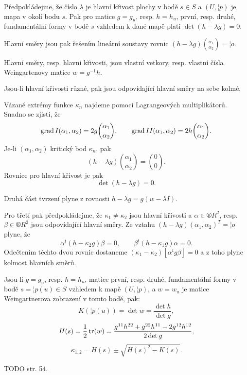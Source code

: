 \documentclass[12pt]{article}                   %
\begin{document}
        \begin{veta}
            Předpokládejme, že číslo $\lambda$ je hlavní křivost plochy v bodě $s \in S$ a $(U, ¦p)$ je mapa v okolí bodu $s$. Pak pro matice $g = g_u$, resp. $h = h_u$, první, resp. druhé, fundamentální formy v bodě $s$ vzhledem k dané mapě platí $\det(h - \lambda g) = 0$.

            Hlavní směry jsou pak řešením lineární soustavy rovnic $(h - \lambda g) \binom{\alpha_1}{\alpha_2} = ¦o$.

            Hlavní směry, resp. hlavní křivosti, jsou vlastní vetkory, resp. vlastní čísla Weingartenovy matice $w = g^{-1}h$.

            Jsou-li hlavní křivosti různé, pak jsou odpovídající hlavní směry na sebe kolmé.

            \begin{dukazin}
                Vázané extrémy funkce $\kappa_n$ najdeme pomocí Lagrangeových multiplikátorů. Snadno se zjistí, že
                $$ \operatorname{grad} I(\alpha_1, \alpha_2) = 2g\binom{\alpha_1}{\alpha_2}, \qquad \operatorname{grad} II(\alpha_1, \alpha_2) = 2h\binom{\alpha_1}{\alpha_2}. $$
                Je-li $(\alpha_1, \alpha_2)$ kritický bod $\kappa_n$, pak
                $$ (h - \lambda g)\binom{\alpha_1}{\alpha_2} = \binom{0}{0}. $$
                Rovnice pro hlavní křivost je pak
                $$ \det(h - \lambda g) = 0. $$

                Druhá část tvrzení plyne z rovnosti $h - \lambda g = g(w - \lambda I)$.

                Pro třetí pak předpokládejme, že $\kappa_1 ≠ \kappa_2$ jsou hlavní křivosti a $\alpha \in ®R^2$, resp. $\beta \in ®R^2$ jsou odpovídající hlavní směry. Ze vztahu $(h - \lambda g)(\alpha_1, \alpha_2)^T = ¦o$ plyne, že
                $$ \alpha^t(h - \kappa_2g)\beta = 0, \qquad \beta^t(h - \kappa_1 g)\alpha = 0. $$
                Odečtením těchto dvou rovnic dostaneme $(\kappa_1 - \kappa_2)[\alpha^tg\beta] = 0$ a z toho plyne kolmost hlavních směrů.
            \end{dukazin}
        \end{veta}

        \begin{veta}
            Jsou-li $g = g_u$, resp. $h = h_u$, matice první, resp. druhé, fundamentální formy v bodě $s = ¦p(u) \in S$ vzhledem k mapě $(U, ¦p)$, a $w = w_u$ je matice Weingartnerova zobrazení v tomto bodě, pak:
            $$ K(¦p(u)) = \det w = \frac{\det h}{\det g}, $$
            $$ H(s) = \frac{1}{2}\operatorname{tr}(w) = \frac{g^{11}h^{22} + g^{22}h^{11} - 2g^{12}h^{12}}{2\det g}, $$
            $$ \kappa_{1, 2} = H(s) ± \sqrt{H(s)^2 - K(s)}. $$ 

            \begin{dukazin}
                TODO str. 54.
            \end{dukazin}
        \end{veta}
\end{document}
